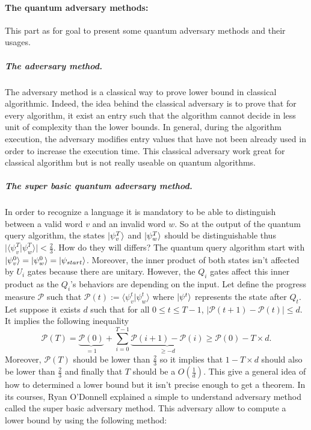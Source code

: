 \paragraph*{\textbf{The quantum adversary methods:}}
This part as for goal to present some quantum adversary methods and their usages.

\subparagraph*{\textbf{The adversary method.}} The adversary method is a classical
way to prove lower bound in classical algorithmic. Indeed, the idea behind the classical
adversary is to prove that for every algorithm, it exist an entry such that the algorithm
cannot decide in less unit of complexity than the lower bounds. In general, during
the algorithm execution, the adversary modifies entry values that have not been already used
in order to increase the execution time. This classical adversary work great for classical
algorithm but is not really useable on  quantum algorithms.

\subparagraph*{\textbf{The super basic quantum adversary method.}}
In order to recognize a language it is mandatory to be able to distinguish between
a valid word $v$ and an invalid word $w$. So at the output of the quantum query
algorithm, the states $|\psi^T_v\rangle$ and $|\psi^T_w\rangle$ should be distinguishable thus
$\vert \langle \psi_v^T \vert \psi_w^T \rangle \vert < \frac{2}{3}$. How do they
will differs? The quantum query algorithm start with
$|\psi^0_v\rangle = |\psi^0_w\rangle = |\psi_{start}\rangle$. Moreover, the inner product
of both states isn't affected by $U_i$ gates because there are unitary. However, the $Q_i$
gates affect this inner product as the $Q_i$'s behaviors are depending on the input.
Let define the progress measure $\mathcal{P}$ such that
$\mathcal{P}(t) := \langle \psi_v^t \vert \psi_w^t \rangle$ where $|\psi^t\rangle$ represents
the state after $Q_t$. Let suppose it exists $d$ such that for all $0\leq t \leq T-1$,
$\vert \mathcal{P}(t+1)-\mathcal{P}(t)\vert \leq d$. It implies the following inequality
\[
    \mathcal{P}(T) = \underbrace{\mathcal{P}(0)}_{=1} + \sum_{i=0}^{T-1}\underbrace{\mathcal{P}(i+1)-\mathcal{P}(i)}_{\geq -d}  \geq \mathcal{P}(0) - T\times d.
\]
Moreover, $\mathcal{P}(T)$ should be lower than $\frac{2}{3}$ so it implies that
$1 - T\times d$ should also be lower than $\frac{2}{3}$ and finally that
$T$ should be a $O(\frac{1}{d})$. This give a general idea of how to determined
a lower bound but it isn't precise enough to get a theorem. In its courses,
Ryan O'Donnell \cite{Odonnel_course} explained a simple to understand adversary method called the super
basic adversary method. This adversary allow to compute a lower bound
by using the following method:

